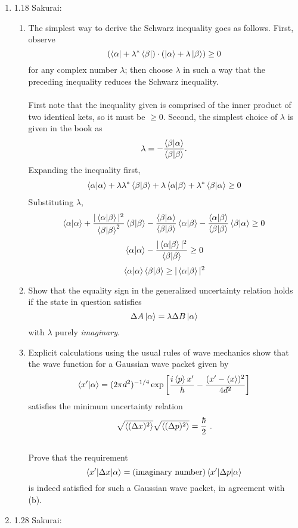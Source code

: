 \documentclass[11pt,letterpaper]{article}
\begin{document}
\begin{enumerate}
\item 1.18 Sakurai: \begin{enumerate}
\item The simplest way to derive the Schwarz inequality goes as follows. First, observe 
$$ (\bra\alpha +\lambda^*\bra\beta)\cdot(\ket\alpha+\lambda\ket\beta)\geq 0$$
for any complex number $\lambda$; then choose $\lambda$ in such a way that the preceding inequality reduces the Schwarz inequality.
\\ \\First note that the inequality given is comprised of the inner product of two identical kets, so it must be $\geq 0$. Second, the simplest choice of $\lambda$ is given in the book as
 $$\lambda = -\frac{\braket{\beta|\alpha}}{\braket{\beta|\beta}}.$$
 Expanding the inequality first,
 \begin{align*}\braket{\alpha|\alpha}+\lambda\lambda^*\braket{\beta|\beta} +\lambda\braket{\alpha|\beta}+\lambda^*\braket{\beta|\alpha} \geq 0
 \end{align*}
 Substituting $\lambda$,
$$\braket{\alpha|\alpha}+\frac{|\braket{\alpha|\beta}|^2}{\braket{\beta|\beta}^2}\braket{\beta|\beta} -\frac{\braket{\beta|\alpha}}{\braket{\beta|\beta}}\braket{\alpha|\beta}-\frac{\braket{\alpha|\beta}}{\braket{\beta|\beta}}\braket{\beta|\alpha} \geq 0$$
$$\braket{\alpha|\alpha} - \frac{|\braket{\alpha|\beta}|^2}{\braket{\beta|\beta}} \geq 0$$
$$\braket{\alpha|\alpha}\braket{\beta|\beta} \geq |\braket{\alpha|\beta}|^2$$
\item Show that the equality sign in the generalized uncertainty relation holds if the state in question satisfies
$$\Delta A \ket\alpha = \lambda \Delta B \ket\alpha$$
with $\lambda$ purely \emph{imaginary}.
\item Explicit calculations using the usual rules of wave mechanics show that the wave function for a Gaussian wave packet given by 
$$\braket{x^\prime|\alpha} = (2\pi d^2)^{-1/4}\exp{\left[\frac{i\braket{p}x^\prime}{\hbar}-\frac{(x^\prime-\braket{x})^2}{4d^2}\right]}$$
satisfies the minimum uncertainty relation
$$\sqrt{\braket{(\Delta x)^2}}\sqrt{\braket{(\Delta p)^2}} = \frac{\hbar}{2}~.$$
\\Prove that the requirement
$$\braket{x^\prime|\Delta x|\alpha} = (\text{imaginary number})\braket{x^\prime|\Delta p|\alpha}$$
is indeed satisfied for such a Gaussian wave packet, in agreement with (b).
\end{enumerate}
\item 1.28 Sakurai: \begin{enumerate}

\end{enumerate}
\end{enumerate}
\end{document}
